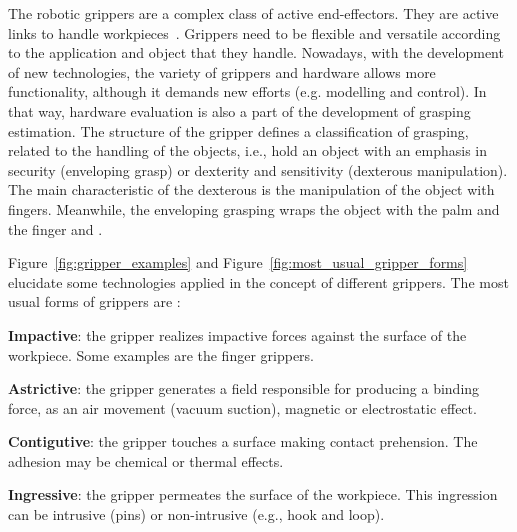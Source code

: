 The robotic grippers are a complex class of active end-effectors. They are active links to handle workpieces~\cite{monkman2007robot}. Grippers need to be flexible and versatile according to the application and object that they handle. Nowadays, with the development of new technologies, the variety of grippers and hardware allows more functionality, although it demands new efforts (e.g. modelling and control). In that way, hardware evaluation is also a part of the development of grasping estimation. The structure of the gripper defines a classification of grasping, related to the handling of the objects, i.e., hold an object with an emphasis in security (enveloping grasp) or dexterity and sensitivity (dexterous manipulation). The main characteristic of the dexterous is the manipulation of the object with fingers. Meanwhile, the enveloping grasping wraps the object with the palm and the finger \cite{Bicchi2000} and \cite{alonso2018current}.


Figure~\ref{fig:gripper_examples} and Figure~\ref{fig:most_usual_gripper_forms} elucidate some technologies applied in the concept of different
grippers. The most usual forms of grippers are \cite{monkman2007robot}:

\begin{itemize_jp}
    \item \textbf{Impactive}: the gripper realizes impactive forces against the surface of the workpiece. Some examples are the finger grippers.
    
    \item \textbf{Astrictive}: the gripper generates a field responsible for producing a binding force, as an air movement (vacuum suction), magnetic or electrostatic effect.
    
    \item \textbf{Contigutive}: the gripper touches a surface making contact prehension. The adhesion may be chemical or thermal effects.
    
    \item \textbf{Ingressive}: the gripper permeates the surface of the workpiece. This ingression can be intrusive (pins) or non-intrusive (e.g., hook and loop).    
\end{itemize_jp}

